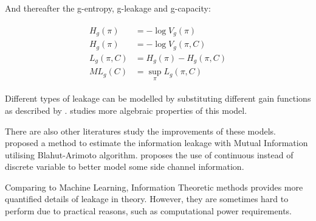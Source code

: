 And thereafter the g-entropy, g-leakage and g-capacity:

\begin{eqnarray}
	\begin{aligned}
		H_{g}(\pi) &= -\log{V_g(\pi)} \\
		H_{g}(\pi) &= -\log{V_g(\pi,C)}\\
		L_g(\pi, C) &= H_{g}(\pi) - H_{g}(\pi, C)\\
		ML_g(C) &= \sup_{\pi}{L_g(\pi,C)}
	\end{aligned}
\end{eqnarray}

Different types of leakage can be modelled by substituting different gain functions as described by \cite{GLeakage}. \cite{AddMulGLeakage} studies more algebraic properties of this model.

There are also other literatures study the improvements of these models. \cite{EstimateLeakage} proposed a method to estimate the information leakage with Mutual Information utilising Blahut-Arimoto algorithm\cite{Blahut}\cite{Arimoto}. \cite{Continuous} proposes the use of continuous instead of discrete variable to  better model some side channel information.

Comparing to Machine Learning, Information Theoretic methods provides more quantified details of leakage in theory. However, they are sometimes hard to perform due to practical reasons, such as computational power requirements.



